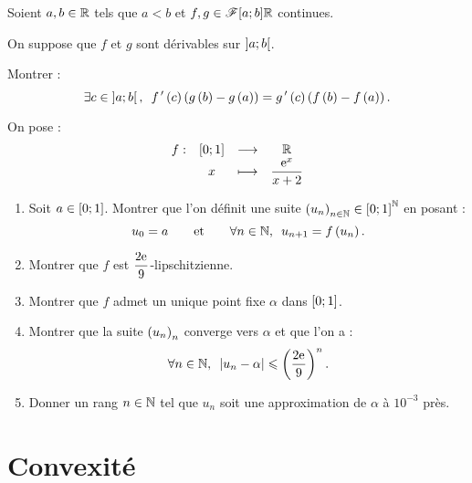 \begin{corr}
\end{corr}

\begin{exo}
Soient \(a,b\in\mathbb{R}\) tels que \(a<b\) et \(f,g\in\mathscr{F}{\left[a;b\right]}{\mathbb{R}}\) continues.

On suppose que \(f\) et \(g\) sont  dérivables sur \(\left]a;b\right[\).

Montrer : \[\quantifs{\exists c\in\intervee{a}{b}}f\prim\paren{c}\paren{g\paren{b}-g\paren{a}}=g\prim\paren{c}\paren{f\paren{b}-f\paren{a}}.\]
\end{exo}

\begin{corr}
\end{corr}

\begin{exo}
On pose : \[\begin{array}[t]{cccc}f : & \left[0;1\right] & \longrightarrow & \mathbb{R} \\ & x & \longmapsto & \dfrac{\mathrm{e}^{x}}{x+2}\end{array}\]

\begin{enumerate}
\item Soit \(a\in\left[0;1\right]\). Montrer que l'on définit une suite \(\left(u_n\right)_{n\in\mathbb{N}}\in\left[0;1\right]^{\mathbb{N}}\) en posant : \[u_0=a\qquad\text{et}\qquad\quantifs{\forall n\in\N}u_{n+1}=f\paren{u_n}.\]

\item Montrer que \(f\) est \(\dfrac{2\mathrm{e}^{}}{9}\)-lipschitzienne. \\

\item Montrer que \(f\) admet un unique point fixe \(\alpha\) dans \(\left[0;1\right]\). \\

\item Montrer que la suite \(\left(u_n\right)_n\) converge vers \(\alpha\) et que l'on a : \[\quantifs{\forall n\in\N}\abs{u_n-\alpha}\leq\paren{\dfrac{2\e{}}{9}}^n.\]

\item Donner un rang \(n\in\mathbb{N}\) tel que \(u_n\) soit une approximation de \(\alpha\) à \(10^{-3}\) près.
\end{enumerate}
\end{exo}

\begin{corr}
\end{corr}

\section{Convexité}


